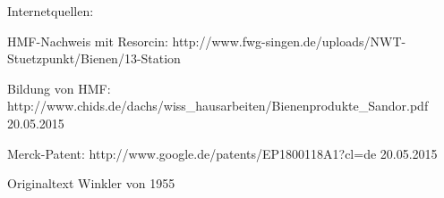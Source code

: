 Internetquellen:

HMF-Nachweis mit Resorcin:
http://www.fwg-singen.de/uploads/NWT-Stuetzpunkt/Bienen/13-Station%

Bildung von HMF:
http://www.chids.de/dachs/wiss_hausarbeiten/Bienenprodukte_Sandor.pdf 20.05.2015

Merck-Patent:
http://www.google.de/patents/EP1800118A1?cl=de 20.05.2015

Originaltext Winkler von 1955



